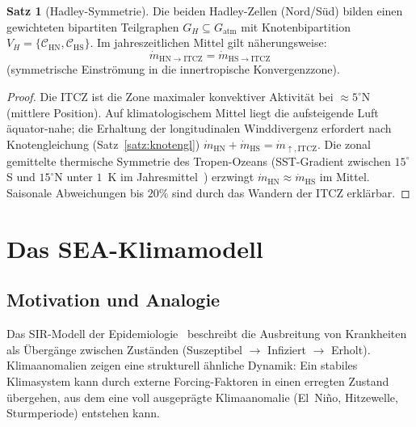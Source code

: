 ﻿\documentclass[a4paper,12pt]{article}
\theoremstyle{definition}
\newtheorem{satz}{Satz}
\begin{document}
\begin{satz}[Hadley-Symmetrie]
\label{satz:hadley}
Die beiden Hadley-Zellen (Nord/S\"ud) bilden einen gewichteten bipartiten Teilgraphen
$G_H \subseteq G_{\mathrm{atm}}$ mit Knotenbipartition
$V_H = \{\mathcal{C}_{\mathrm{HN}}, \mathcal{C}_{\mathrm{HS}}\}$.
Im jahreszeitlichen Mittel gilt n\"aherungsweise:
\[
\dot{m}_{\mathrm{HN} \to \mathrm{ITCZ}} = \dot{m}_{\mathrm{HS} \to \mathrm{ITCZ}}
\]
(symmetrische Einströmung in die innertropische Konvergenzzone).
\end{satz}

\begin{proof}
Die ITCZ ist die Zone maximaler konvektiver Aktivit\"at bei $\approx 5^\circ$N (mittlere Position).
Auf klimatologischem Mittel liegt die aufsteigende Luft \"aquator-nahe;
die Erhaltung der longitudinalen Winddivergenz erfordert nach Knotengleichung (Satz~\ref{satz:knotengl})
$\dot{m}_{\mathrm{HN}} + \dot{m}_{\mathrm{HS}} = \dot{m}_{\uparrow, \mathrm{ITCZ}}$.
Die zonal gemittelte thermische Symmetrie des Tropen-Ozeans (SST-Gradient zwischen
$15^\circ$S und $15^\circ$N unter $1$~K im Jahresmittel~\cite{hartmann2016}) erzwingt
$\dot{m}_{\mathrm{HN}} \approx \dot{m}_{\mathrm{HS}}$ im Mittel. Saisonale Abweichungen
bis $20\%$ sind durch das Wandern der ITCZ erkl\"arbar.
\end{proof}

\section{Das SEA-Klimamodell}

\subsection{Motivation und Analogie}

Das SIR-Modell der Epidemiologie~\cite{epp2026r0} beschreibt die Ausbreitung
von Krankheiten als \"Uberg\"ange zwischen Zust\"anden
(Suszeptibel $\to$ Infiziert $\to$ Erholt). Klimaanomalien zeigen eine strukturell
\"ahnliche Dynamik: Ein stabiles Klimasystem kann durch externe Forcing-Faktoren
in einen erregten Zustand \"ubergehen, aus dem eine voll ausgepr\"agte Klimaanomalie
(El~Ni\~no, Hitzewelle, Sturmperiode) entstehen kann.
\end{document}
